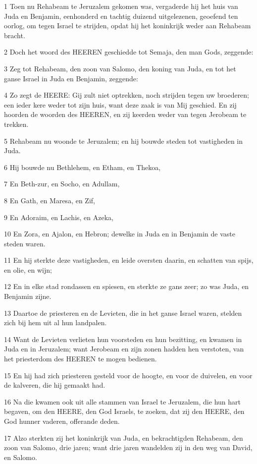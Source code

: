 \par 1 Toen nu Rehabeam te Jeruzalem gekomen was, vergaderde hij het huis van Juda en Benjamin, eenhonderd en tachtig duizend uitgelezenen, geoefend ten oorlog, om tegen Israel te strijden, opdat hij het koninkrijk weder aan Rehabeam bracht.
\par 2 Doch het woord des HEEREN geschiedde tot Semaja, den man Gods, zeggende:
\par 3 Zeg tot Rehabeam, den zoon van Salomo, den koning van Juda, en tot het ganse Israel in Juda en Benjamin, zeggende:
\par 4 Zo zegt de HEERE: Gij zult niet optrekken, noch strijden tegen uw broederen; een ieder kere weder tot zijn huis, want deze zaak is van Mij geschied. En zij hoorden de woorden des HEEREN, en zij keerden weder van tegen Jerobeam te trekken.
\par 5 Rehabeam nu woonde te Jeruzalem; en hij bouwde steden tot vastigheden in Juda.
\par 6 Hij bouwde nu Bethlehem, en Etham, en Thekoa,
\par 7 En Beth-zur, en Socho, en Adullam,
\par 8 En Gath, en Maresa, en Zif,
\par 9 En Adoraim, en Lachis, en Azeka,
\par 10 En Zora, en Ajalon, en Hebron; dewelke in Juda en in Benjamin de vaste steden waren.
\par 11 En hij sterkte deze vastigheden, en leide oversten daarin, en schatten van spijs, en olie, en wijn;
\par 12 En in elke stad rondassen en spiesen, en sterkte ze gans zeer; zo was Juda, en Benjamin zijne.
\par 13 Daartoe de priesteren en de Levieten, die in het ganse Israel waren, stelden zich bij hem uit al hun landpalen.
\par 14 Want de Levieten verlieten hun voorsteden en hun bezitting, en kwamen in Juda en in Jeruzalem; want Jerobeam en zijn zonen hadden hen verstoten, van het priesterdom des HEEREN te mogen bedienen.
\par 15 En hij had zich priesteren gesteld voor de hoogte, en voor de duivelen, en voor de kalveren, die hij gemaakt had.
\par 16 Na die kwamen ook uit alle stammen van Israel te Jeruzalem, die hun hart begaven, om den HEERE, den God Israels, te zoeken, dat zij den HEERE, den God hunner vaderen, offerande deden.
\par 17 Alzo sterkten zij het koninkrijk van Juda, en bekrachtigden Rehabeam, den zoon van Salomo, drie jaren; want drie jaren wandelden zij in den weg van David, en Salomo.
